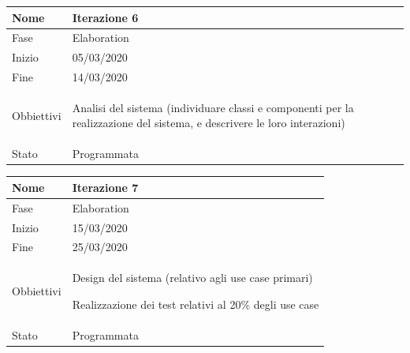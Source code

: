 \begin{center}
\begin{tabular}{ |p{2cm}|p{10cm}|  }
\hline
Nome & Iterazione 6 \\\hline
Fase & Elaboration \\\hline
Inizio & 05/03/2020 \\\hline
Fine &  14/03/2020  \\\hline
Obbiettivi & 
	\begin{compactitem}
		\item Analisi del sistema (individuare classi e componenti per la realizzazione del sistema, e descrivere le loro interazioni)
	\end{compactitem}\\\hline
Stato &  Programmata \\\hline
\end{tabular}
\label{table:6}\newline

\begin{tabular}{ |p{2cm}|p{10cm}|  }
\hline
Nome & Iterazione 7 \\\hline
Fase & Elaboration \\\hline
Inizio & 15/03/2020 \\\hline
Fine & 25/03/2020 \\\hline
Obbiettivi & 
	\begin{compactitem}
		\item Design del sistema (relativo agli use case primari)
		\item Realizzazione dei test relativi al 20\% degli use case
	\end{compactitem}\\\hline
Stato &  Programmata \\\hline
\end{tabular}
\label{table:7}\newline


\end{center}
